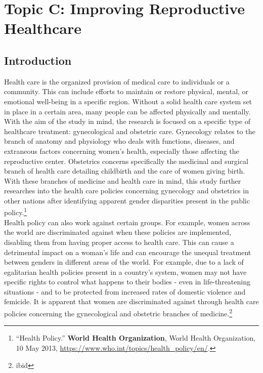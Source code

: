 \documentclass[10pt, letterpaper]{article}
\begin{document}
\newpage
\section{Topic C: Improving Reproductive Healthcare}

\subsection{Introduction}

Health care is the organized provision of medical care to individuals or
a community. This can include efforts to maintain or restore physical,
mental, or emotional well-being in a specific region. Without a solid
health care system set in place in a certain area, many people can be
affected physically and mentally. With the aim of the study in mind, the
research is focused on a specific type of healthcare treatment:
gynecological and obstetric care. Gynecology relates to the branch of
anatomy and physiology who deals with functions, diseases, and
extraneous factors concerning women's health, especially those affecting
the reproductive center. Obstetrics concerns specifically the medicinal
and surgical branch of health care detailing childbirth and the care of
women giving birth. With these branches of medicine and health care in
mind, this study further researches into the health care policies
concerning gynecology and obstetrics in other nations after identifying
apparent gender disparities present in the public policy.\footnote{``Health
  Policy.'' \textbf{World Health Organization}, World Health Organization,
  10 May 2013, \url{https://www.who.int/topics/health_policy/en/}.} \\

Health policy can also work against certain groups. For example, women
across the world are discriminated against when these policies are
implemented, disabling them from having proper access to health care.
This can cause a detrimental impact on a woman's life and can encourage
the unequal treatment between genders in different areas of the world.
For example, due to a lack of egalitarian health policies present in a
country's system, women may not have specific rights to control what
happens to their bodies - even in life-threatening situations - and to
be protected from increased rates of domestic violence and femicide. It
is apparent that women are discriminated against through health care
policies concerning the gynecological and obstetric branches of
medicine.\footnote{ibid} \\
\end{document}

